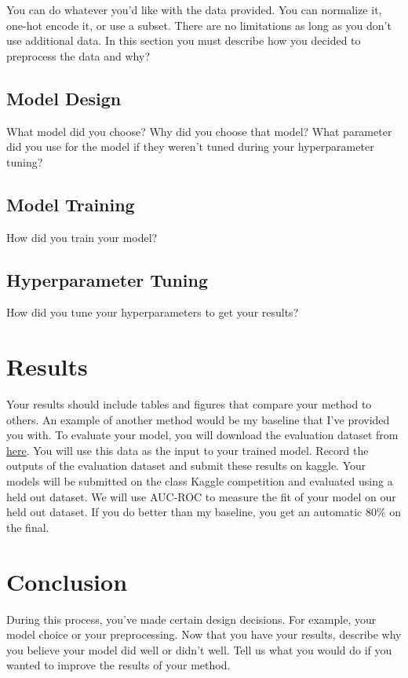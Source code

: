 \documentclass{article}
\begin{document}
You can do whatever you'd like with the data provided. You can normalize it, one-hot encode it, or use a subset. There are no limitations as long as you don't use additional data. In this section you must describe how you decided to preprocess the data and why?

\subsection{Model Design}

What model did you choose? Why did you choose that model? What parameter did you use for the model if they weren't tuned during your hyperparameter tuning?

\subsection{Model Training}

How did you train your model?

\subsection{Hyperparameter Tuning}

How did you tune your hyperparameters to get your results?

\section{Results}

Your results should include tables and figures that compare your method to others. An example of another method would be my baseline that I've provided you with. To evaluate your model, you will download the evaluation dataset from \href{https://www.kaggle.com/competitions/csce-421-machine-learning-spring-2023-section-501/data}{here}. You will use this data as the input to your trained model. Record the outputs of the evaluation dataset and submit these results on kaggle. Your models will be submitted on the class Kaggle competition and evaluated using a held out dataset. We will use AUC-ROC to measure the fit of your model on our held out dataset. If you do better than my baseline, you get an automatic 80$\%$ on the final.

\section{Conclusion}

During this process, you've made certain design decisions. For example, your model choice or your preprocessing. Now that you have your results, describe why you believe your model did well or didn't well. Tell us what you would do if you wanted to improve the results of your method.
\end{document}
